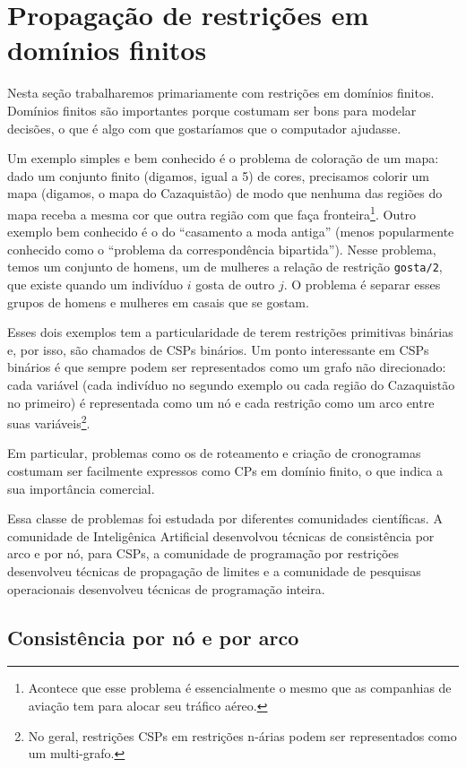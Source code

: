 \documentclass{article}
\begin{document}
\section{Propagação de restrições em domínios finitos}

Nesta seção trabalharemos primariamente com restrições em domínios finitos.
Domínios finitos são importantes porque costumam ser bons para modelar
decisões, o que é algo com que gostaríamos que o computador ajudasse.

Um exemplo simples e bem conhecido é o problema de coloração de um mapa: dado um conjunto finito (digamos, igual a 5) de cores, precisamos colorir um mapa (digamos, o mapa do Cazaquistão) de modo que nenhuma das regiões do mapa receba a mesma cor que outra região com que faça fronteira\footnote{Acontece que esse problema é essencialmente o mesmo que as companhias de aviação tem para alocar seu tráfico aéreo.}.
Outro exemplo bem conhecido é o do ``casamento a moda antiga'' (menos popularmente conhecido como o ``problema da correspondência bipartida'').
Nesse problema, temos um conjunto de homens, um de mulheres a relação de restrição {\tt gosta/2}, que existe quando um indivíduo $i$ gosta de outro $j$.
O problema é separar esses grupos de homens e mulheres em casais que se gostam.

Esses dois exemplos tem a particularidade de terem restrições primitivas binárias e, por isso, são chamados de CSPs binários. Um ponto interessante em CSPs binários é que sempre podem ser representados como um grafo não direcionado:
  cada variável (cada indivíduo no segundo exemplo ou cada região do Cazaquistão no primeiro) é representada como um nó e cada restrição como um arco entre suas variáveis\footnote{No geral, restrições CSPs em restrições n-árias podem ser representados como um multi-grafo.}.

  Em particular, problemas como os de roteamento e criação de cronogramas
  costumam ser facilmente expressos como CPs em domínio finito, o que indica a sua importância comercial.

  Essa classe de problemas foi estudada por diferentes comunidades científicas.
  A comunidade de Inteligênica Artificial desenvolvou técnicas de consistência
por arco e por nó, para CSPs, a comunidade de programação por restrições desenvolveu  técnicas de propagação de limites e a comunidade de pesquisas
operacionais desenvolveu técnicas de programação inteira.

\subsection{Consistência por nó e por arco}
\end{document}

